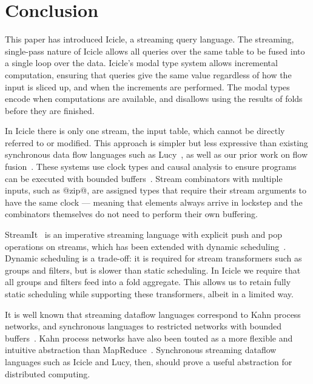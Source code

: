 \eject
\section{Conclusion}
\label{s:Conclusion}
This paper has introduced Icicle, a streaming query language.
The streaming, single-pass nature of Icicle allows all queries over the same table to be fused into a single loop over the data.
Icicle's modal type system allows incremental computation, ensuring that queries give the same value regardless of how the input is sliced up, and when the increments are performed.
The modal types encode when computations are available, and disallows using the results of folds before they are finished.

In Icicle there is only one stream, the input table, which cannot be directly referred to or modified.
This approach is simpler but less expressive than existing synchronous data flow languages such as Lucy~\cite{mandel2010lucy}, as well as our prior work on flow fusion~\cite{lippmeier2013data}.
These systems use clock types and causal analysis to ensure programs can be executed with bounded buffers~\cite{stephens1997survey}.
Stream combinators with multiple inputs, such as @zip@, are assigned types that require their stream arguments to have the same clock --- meaning that elements always arrive in lockstep and the combinators themselves do not need to perform their own buffering.

StreamIt~\cite{thies2002streamit} is an imperative streaming language with explicit push and pop operations on streams, which has been extended with dynamic scheduling~\cite{soule2013dynamic}. 
Dynamic scheduling is a trade-off: it is required for stream transformers such as groups and filters, but is slower than static scheduling.
In Icicle we require that all groups and filters feed into a fold aggregate.
This allows us to retain fully static scheduling while supporting these transformers, albeit in a limited way.

It is well known that streaming dataflow languages correspond to Kahn process networks, and synchronous languages to restricted networks with bounded buffers~\cite{johnston2004advances}.
Kahn process networks have also been touted as a more flexible and intuitive abstraction than MapReduce~\cite{vrba2009kahn}.
Synchronous streaming dataflow languages such as Icicle and Lucy, then, should prove a useful abstraction for distributed computing.


